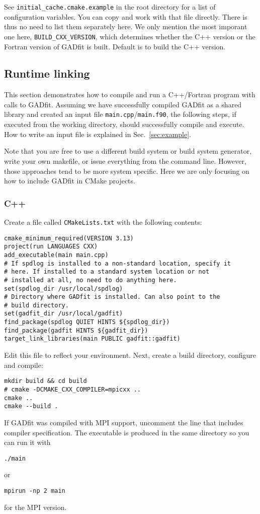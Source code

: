\documentclass{article}
\begin{document}
See \verb+initial_cache.cmake.example+ in the root directory for a list of configuration variables. You can copy and work with that file directly. There is thus no need to list them separately here. We only mention the most imporant one here, \verb+BUILD_CXX_VERSION+, which determines whether the C++ version or the Fortran version of GADfit is built. Default is to build the C++ version.

\subsection{\label{sec:runtime}Runtime linking}

This section demonstrates how to compile and run a C++/Fortran program with calls to GADfit. Assuming we have successfully compiled GADfit as a shared library and created an input file \verb+main.cpp+/\verb+main.f90+, the following steps, if executed from the working directory, should successfully compile and execute. How to write an input file is explained in Sec.~\ref{sec:example}.

Note that you are free to use a different build system or build system generator, write your own makefile, or issue everything from the command line. However, those approaches tend to be more system specific. Here we are only focusing on how to include GADfit in CMake projects.

\subsubsection{C++}

Create a file called \verb+CMakeLists.txt+ with the following contents:
\begin{verbatim}
cmake_minimum_required(VERSION 3.13)
project(run LANGUAGES CXX)
add_executable(main main.cpp)
# If spdlog is installed to a non-standard location, specify it
# here. If installed to a standard system location or not
# installed at all, no need to do anything here.
set(spdlog_dir /usr/local/spdlog)
# Directory where GADfit is installed. Can also point to the
# build directory.
set(gadfit_dir /usr/local/gadfit)
find_package(spdlog QUIET HINTS ${spdlog_dir})
find_package(gadfit HINTS ${gadfit_dir})
target_link_libraries(main PUBLIC gadfit::gadfit)
\end{verbatim}
Edit this file to reflect your environment. Next, create a build directory, configure and compile:
\begin{verbatim}
mkdir build && cd build
# cmake -DCMAKE_CXX_COMPILER=mpicxx ..
cmake ..
cmake --build .
\end{verbatim}
If GADfit was compiled with MPI support, uncomment the line that includes compiler specification. The executable is produced in the same directory so you can run it with
\begin{verbatim}
./main
\end{verbatim}
or
\begin{verbatim}
mpirun -np 2 main
\end{verbatim}
for the MPI version.
\end{document}
